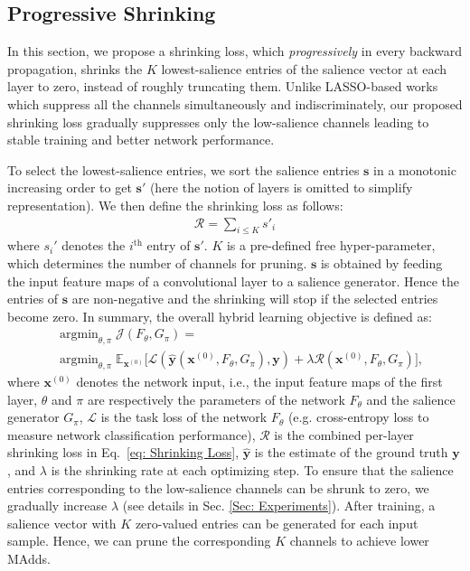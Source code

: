 \documentclass[lettersize,journal]{IEEEtran}
\begin{document}
\subsection{Progressive Shrinking}
\label{Sec: Progressive Shrinking}

In this section, we propose a shrinking loss, which \textit{progressively} in every backward propagation, shrinks the $K$ lowest-salience entries of the salience vector at each layer to zero, instead of roughly truncating them. Unlike LASSO-based works~\cite{gao2018dynamic,su2020dynamic,tang2021manifold} which suppress all the channels simultaneously and indiscriminately, our proposed shrinking loss gradually suppresses only the low-salience channels leading to stable training and better network performance. 

To select the lowest-salience entries, we sort the
salience entries $\boldsymbol{s}$ in a monotonic increasing order to get $\boldsymbol{s}'$ (here the notion of layers is omitted to simplify representation). We then define the shrinking loss as follows:
\begin{align}
\label{eq: Shrinking Loss}
  \mathcal{R} = \sum_{i\leq K} s'_i
\end{align}
where ${s_i}'$  denotes the $i^{\text{th}}$ entry of  $\boldsymbol{s}'$. $K$ is a pre-defined free hyper-parameter, which determines the number of channels for pruning. 
$\boldsymbol{s}$ is obtained by feeding the input feature maps of a convolutional layer to a salience generator.
Hence the entries of $\boldsymbol{s}$ are  non-negative and the shrinking will stop if the selected entries become zero.
In summary, the overall hybrid learning objective is defined as:
\begin{equation}
    \begin{aligned}
  \label{overall objective}
  &\mathop{\arg\min}_{\theta,\pi}\mathcal{J}(F_{\theta},G_{\pi})= \\
  &
  \mathop{\arg\min}_{\theta,\pi}\mathbb{E}_{\boldsymbol{x}^{(0)}}\Big[\mathcal{L}(\boldsymbol{\hat{y}} (\boldsymbol{x}^{(0)},F_{\theta},G_{\pi}),\boldsymbol{y})+\lambda \mathcal{R}(\boldsymbol{x}^{(0)},F_{\theta},G_{\pi})\Big], 
\end{aligned}
\end{equation}
where $\boldsymbol{x}^{(0)}$ denotes the network input, i.e., the input feature maps of the first layer, $\theta$ and $\pi$ are respectively the parameters of the network $F_{\theta}$ and the 
salience generator $G_{\pi}$, $\mathcal{L}$ is the task loss of the network $F_{\theta}$ (e.g. cross-entropy loss to measure network classification performance), $\mathcal{R}$ is the combined per-layer shrinking loss in Eq.~\eqref{eq: Shrinking Loss}, $\boldsymbol{\hat{y}}$ is the estimate of the ground truth $\boldsymbol{y}$, and $\lambda$ is the shrinking rate at each optimizing step. To ensure that the salience entries corresponding to the low-salience channels can be shrunk to zero, we gradually increase $\lambda$ (see details in Sec. \ref{Sec: Experiments}). After training, a salience vector with $K$ zero-valued entries can be generated for each input sample. Hence, we can prune the corresponding $K$ channels to achieve lower MAdds. 
\end{document}
